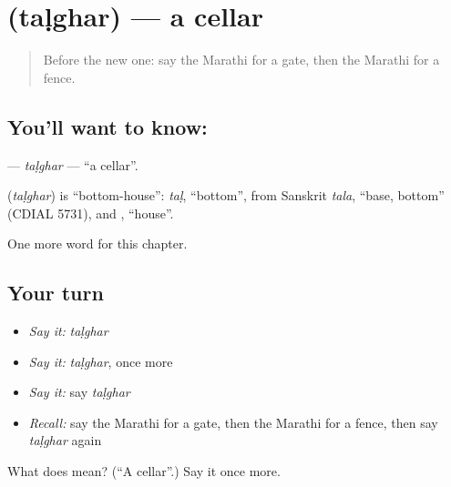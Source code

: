 \section[\texorpdfstring{\mr{तळघर} (taḷghar)}{तळघर (taḷghar)}]{ (taḷghar) — a cellar}

\label{lesson:MR-C213-talghar}



\begin{quote}
Before the new one: say the Marathi for a gate, then the Marathi for a fence.
\end{quote}

\subsection*{You'll want to know: }
\textbf{} — \emph{taḷghar} — \textquotedblleft{}a cellar\textquotedblright{}.

\begin{cousinweb}
\textbf{} (\emph{taḷghar}) is \textquotedblleft{}bottom-house\textquotedblright{}: \emph{taḷ}, \textquotedblleft{}bottom\textquotedblright{}, from Sanskrit \emph{tala}, \textquotedblleft{}base, bottom\textquotedblright{} (CDIAL 5731), and \textbf{}, \textquotedblleft{}house\textquotedblright{}.
\end{cousinweb}

\begin{grammarlens}[title={What you've built}]
One more word for this chapter.
\end{grammarlens}

\subsection*{Your turn}
\begin{itemize}
\raggedright
  \item \emph{Say it:} \emph{taḷghar}
  \item \emph{Say it:} \emph{taḷghar}, once more
  \item \emph{Say it:} say \emph{taḷghar}
  \item \emph{Recall:} say the Marathi for a gate, then the Marathi for a fence, then say \emph{taḷghar} again
\end{itemize}

\begin{tcolorbox}[breakable,colback=teal!4,colframe=teal!35!black,title={Before you move on}]
What does  mean? (\textquotedblleft{}A cellar\textquotedblright{}.) Say it once more.
\end{tcolorbox}
